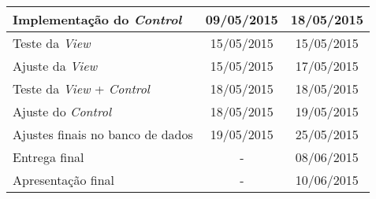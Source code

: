 \documentclass[a4paper,12pt]{article}
\begin{document}
{\begin{longtable}{|l|c|c|}
\hline
\rowcolor{electricgreen}
Implementação do \textit{Control}         & 09/05/2015                           & 18/05/2015                        \\ \hline

\hline
\rowcolor{electricgreen}
Teste da \textit{View}                    & 15/05/2015                           & 15/05/2015                        \\ \hline

\hline
\rowcolor{electricgreen}
Ajuste da \textit{View}                   & 15/05/2015                           & 17/05/2015                        \\ \hline

\hline
\rowcolor{electricgreen}
Teste da \textit{View} + \textit{Control} & 18/05/2015                           & 18/05/2015                        \\ \hline

Ajuste do \textit{Control}                & 18/05/2015                           & 19/05/2015                        \\ \hline
Ajustes finais no banco de dados          & 19/05/2015                           & 25/05/2015                        \\ \hline
Entrega final                             & \multicolumn{1}{c|}{-}               & 08/06/2015                        \\ \hline
Apresentação final                        & \multicolumn{1}{c|}{-}               & 10/06/2015                        \\ \hline
\end{longtable}
}
\end{document}
